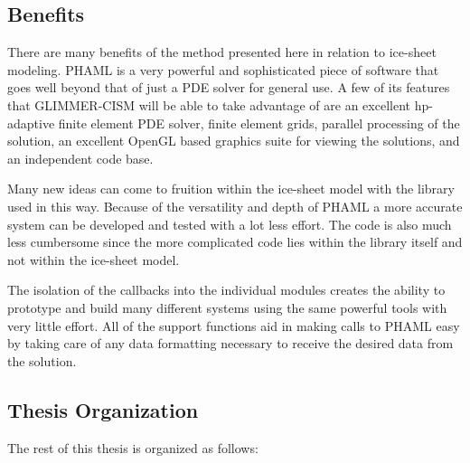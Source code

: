\subsection{Benefits}\label{sec:chp1benefits}

There are many benefits of the method presented here in relation to ice-sheet modeling.  PHAML is a very powerful and sophisticated piece of software that goes well beyond that of just a PDE solver for general use.  A few of its features that GLIMMER-CISM will be able to take advantage of are an excellent hp-adaptive finite element PDE solver, finite element grids, parallel processing of the solution, an excellent OpenGL based graphics suite for viewing the solutions, and an independent code base.%

Many new ideas can come to fruition within the ice-sheet model with the library used in this way.  Because of the versatility and depth of PHAML a more accurate system can be developed and tested with a lot less effort.  The code is also much less cumbersome since the more complicated code lies within the library itself and not within the ice-sheet model.

The isolation of the callbacks into the individual modules creates the ability to prototype and build many different systems using the same powerful tools with very little effort.  All of the support functions aid in making calls to PHAML easy by taking care of any data formatting necessary to receive the desired data from the solution.



\subsection{Thesis Organization}\label{sec:chp1organization}

The rest of this thesis is organized as follows:

